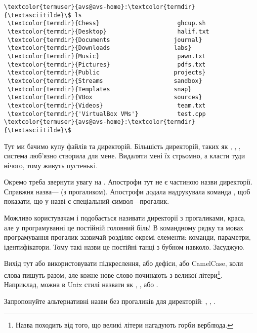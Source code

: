 \begin{Verbatim}[fontsize=\footnotesize,commandchars=\\\{\},xleftmargin=\parindent]
\textcolor{termuser}{avs@avs-home}:\textcolor{termdir}{\textasciitilde}\$ ls
 \textcolor{termdir}{Chess}                      ghcup.sh
 \textcolor{termdir}{Desktop}                    halif.txt
 \textcolor{termdir}{Documents                  journal}
 \textcolor{termdir}{Downloads                  labs}
 \textcolor{termdir}{Music}                      pawn.txt
 \textcolor{termdir}{Pictures}                   pdfs.txt
 \textcolor{termdir}{Public                     projects}
 \textcolor{termdir}{Streams                    sandbox}
 \textcolor{termdir}{Templates                  snap}
 \textcolor{termdir}{VBox                       sources}
 \textcolor{termdir}{Videos}                     team.txt
 \textcolor{termdir}{'VirtualBox VMs'}           test.cpp
\textcolor{termuser}{avs@avs-home}:\textcolor{termdir}{\textasciitilde}\$
\end{Verbatim}

Тут ми бачимо купу файлів та директорій.
Більшість директорій, таких як , , ,
система люб'язно створила для мене.
Видаляти мені їх стрьомно, а класти туди нічого, тому живуть пустенькі.

Окремо треба звернути увагу на .
Апострофи тут не є частиною назви директорії.
Справжня назва--- (з прогаликом).
Апострофи додала надрукувала команда ,
щоб показати, що у назві є спеціальний символ---прогалик.

Можливо користувачам і подобається називати директорії з прогаликами, краса,
але у програмуванні це постійній головний біль!
В командному рядку та мовах програмування прогалик зазвичай розділяє
окремі елементи: команди, параметри, ідентифікатори.
Тому такі назви це постійні танці з бубном навколо.
Засуджую.

Вихід тут або використовувати підкреслення, або дефіси, або CamelCase,
коли слова пишуть разом, але кожне нове слово починають з великої літери\footnote{
Назва походить від того, що великі літери нагадують горби верблюда.
}.
Наприклад,  можна в Unix стилі назвати як
, , або .

\begin{exercise}
Запропонуйте альтернативні назви без прогаликів для директорій:
, , .
\end{exercise}

